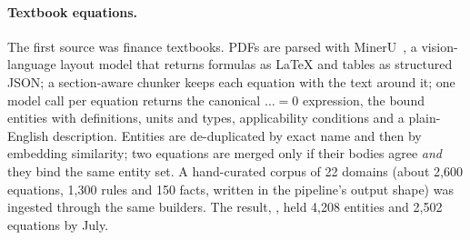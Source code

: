 \paragraph{Textbook equations.}
The first source was finance textbooks. PDFs are parsed with MinerU~\citep{wang2024mineru}, a vision-language layout model that returns formulas as LaTeX and tables as structured JSON; a section-aware chunker keeps each equation with the text around it; one model call per equation returns the canonical \(\ldots=0\) expression, the bound entities with definitions, units and types, applicability conditions and a plain-English description. Entities are de-duplicated by exact name and then by embedding similarity; two equations are merged only if their bodies agree \emph{and} they bind the same entity set. A hand-curated corpus of 22 domains (about 2,600 equations, 1,300 rules and 150 facts, written in the pipeline's output shape) was ingested through the same builders. The result, , held 4,208 entities and 2,502 equations by July.

